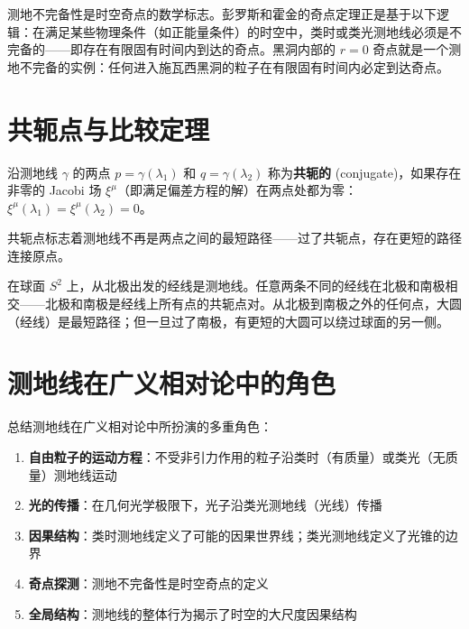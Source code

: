 \begin{remark}[物理意义]
测地不完备性是时空奇点的数学标志。彭罗斯和霍金的奇点定理正是基于以下逻辑：在满足某些物理条件（如正能量条件）的时空中，类时或类光测地线必须是不完备的——即存在有限固有时间内到达的奇点。黑洞内部的 $r=0$ 奇点就是一个测地不完备的实例：任何进入施瓦西黑洞的粒子在有限固有时间内必定到达奇点。
\end{remark}

\section{共轭点与比较定理}

\begin{definition}[共轭点]
沿测地线 $\gamma$ 的两点 $p = \gamma(\lambda_1)$ 和 $q = \gamma(\lambda_2)$ 称为\textbf{共轭的} (conjugate)，如果存在非零的 Jacobi 场 $\xi^\mu$（即满足偏差方程的解）在两点处都为零：$\xi^\mu(\lambda_1) = \xi^\mu(\lambda_2) = 0$。
\end{definition}

共轭点标志着测地线不再是两点之间的最短路径——过了共轭点，存在更短的路径连接原点。

在球面 $S^2$ 上，从北极出发的经线是测地线。任意两条不同的经线在北极和南极相交——北极和南极是经线上所有点的共轭点对。从北极到南极之外的任何点，大圆（经线）是最短路径；但一旦过了南极，有更短的大圆可以绕过球面的另一侧。

\section{测地线在广义相对论中的角色}

总结测地线在广义相对论中所扮演的多重角色：

\begin{enumerate}
    \item \textbf{自由粒子的运动方程}：不受非引力作用的粒子沿类时（有质量）或类光（无质量）测地线运动
    \item \textbf{光的传播}：在几何光学极限下，光子沿类光测地线（光线）传播
    \item \textbf{因果结构}：类时测地线定义了可能的因果世界线；类光测地线定义了光锥的边界
    \item \textbf{奇点探测}：测地不完备性是时空奇点的定义
    \item \textbf{全局结构}：测地线的整体行为揭示了时空的大尺度因果结构
\end{enumerate}


